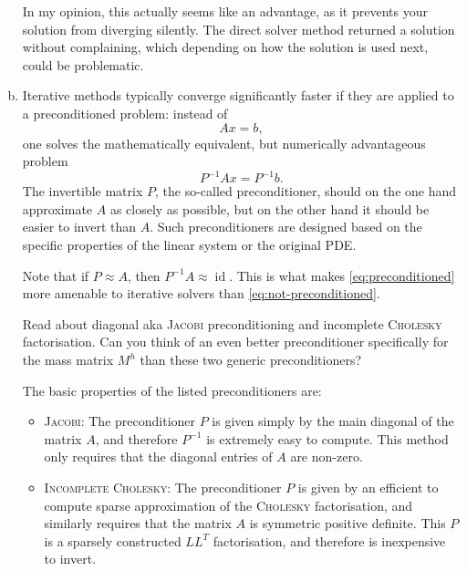 \begin{enumerate}[(a)]
\begin{solution}
In my opinion, this actually seems like an advantage, as it prevents your solution from diverging silently.
The direct solver method returned a solution without complaining, which depending on how the solution is used next, could be problematic.
\end{solution}

\newpage
\item Iterative methods typically converge significantly faster if they are applied to a preconditioned problem: instead of
\begin{equation}\label{eq:not-preconditioned}
Ax=b,
\end{equation}
one solves the mathematically equivalent, but numerically advantageous problem
\begin{equation}\label{eq:preconditioned}
P^{-1}Ax = P^{-1} b.
\end{equation}
The invertible matrix $P$, the so-called preconditioner, should on the one hand approximate $A$ as closely as possible, but on the other hand it should be easier to invert than $A$. Such preconditioners are designed based on the specific properties of the linear system or the original PDE.

Note that if $P \approx A$, then $P^{-1}A \approx \operatorname{id}$. This is what makes \eqref{eq:preconditioned} more amenable to iterative solvers than \eqref{eq:not-preconditioned}. 

Read about diagonal aka \textsc{Jacobi} preconditioning and incomplete \textsc{Cholesky} factorisation. Can you think of an even better preconditioner specifically for the mass matrix $M^h$ than these two generic preconditioners?

\vspace{0.25cm}
\begin{solution}
The basic properties of the listed preconditioners are:
\begin{itemize}
\item \textsc{Jacobi:} The preconditioner $P$ is given simply by the main diagonal of the matrix $A$, and therefore $P^{-1}$ is extremely easy to compute. This method only requires that the diagonal entries of $A$ are non-zero.
\item \textsc{Incomplete Cholesky:} The preconditioner $P$ is given by an efficient to compute sparse approximation of the \textsc{Cholesky} factorisation, and similarly requires that the matrix $A$ is symmetric positive definite. This $P$ is a sparsely constructed $LL^T$ factorisation, and therefore is inexpensive to invert.
\end{itemize}


\end{solution}
\end{enumerate}

